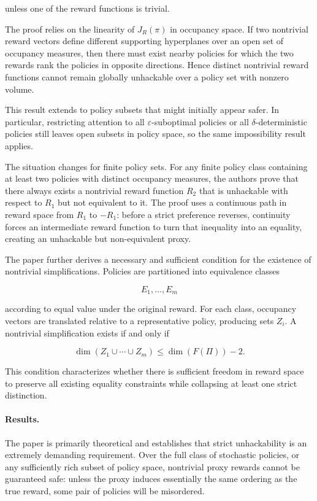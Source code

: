 \documentclass[11pt]{article}
\begin{document}
unless one of the reward functions is trivial.

The proof relies on the linearity of $J_R(\pi)$ in occupancy space. If two nontrivial reward vectors define different supporting hyperplanes over an open set of occupancy measures, then there must exist nearby policies for which the two rewards rank the policies in opposite directions. Hence distinct nontrivial reward functions cannot remain globally unhackable over a policy set with nonzero volume.

This result extends to policy subsets that might initially appear safer. In particular, restricting attention to all $\varepsilon$-suboptimal policies or all $\delta$-deterministic policies still leaves open subsets in policy space, so the same impossibility result applies.

The situation changes for finite policy sets. For any finite policy class containing at least two policies with distinct occupancy measures, the authors prove that there always exists a nontrivial reward function $R_2$ that is unhackable with respect to $R_1$ but not equivalent to it. The proof uses a continuous path in reward space from $R_1$ to $-R_1$: before a strict preference reverses, continuity forces an intermediate reward function to turn that inequality into an equality, creating an unhackable but non-equivalent proxy.

The paper further derives a necessary and sufficient condition for the existence of nontrivial simplifications. Policies are partitioned into equivalence classes

\[
E_1,\ldots,E_m
\]

according to equal value under the original reward. For each class, occupancy vectors are translated relative to a representative policy, producing sets $Z_i$. A nontrivial simplification exists if and only if

\[
\dim
\left(
Z_1\cup\cdots\cup Z_m
\right)
\leq
\dim(F(\Pi))-2.
\]

This condition characterizes whether there is sufficient freedom in reward space to preserve all existing equality constraints while collapsing at least one strict distinction.

\paragraph{Results.}

The paper is primarily theoretical and establishes that strict unhackability is an extremely demanding requirement. Over the full class of stochastic policies, or any sufficiently rich subset of policy space, nontrivial proxy rewards cannot be guaranteed safe: unless the proxy induces essentially the same ordering as the true reward, some pair of policies will be misordered.
\end{document}

